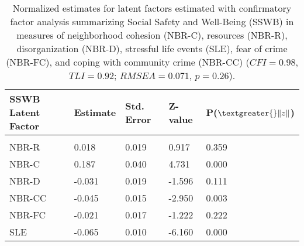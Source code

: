 \documentclass[utf8]{article}
\begin{document}
\begin{table}[]
\begin{tabular}{lllll}
SSWB Latent Factor & Estimate & Std. Error & Z-value & P($\textgreater{}\|z\|$) \\ \hline
                   &          &            &         &                          \\
NBR-R              & 0.018    & 0.019      & 0.917   & 0.359                    \\
NBR-C              & 0.187    & 0.040      & 4.731   & 0.000                    \\
NBR-D              & -0.031   & 0.019      & -1.596  & 0.111                    \\
NBR-CC             & -0.045   & 0.015      & -2.950  & 0.003                    \\
NBR-FC             & -0.021   & 0.017      & -1.222  & 0.222                    \\
SLE                & -0.065   & 0.010      & -6.160  & 0.000                   
\end{tabular}
\caption{Normalized estimates for latent factors estimated with confirmatory factor analysis summarizing Social Safety and Well-Being (SSWB)  in measures of neighborhood cohesion (NBR-C), resources (NBR-R), disorganization (NBR-D), stressful life events (SLE), fear of crime (NBR-FC), and coping with community crime (NBR-CC) ($CFI=0.98$, $TLI=0.92$; $RMSEA=0.071$, $p=0.26$).\label{tab:7}}
\end{table}
\end{document}
